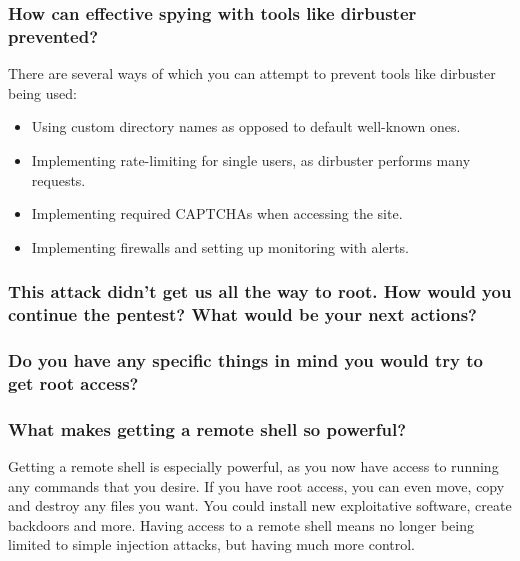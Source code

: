 \subsubsection{How can effective spying with tools like dirbuster prevented?}
There are several ways of which you can attempt to prevent tools like dirbuster being used:

\begin{itemize}
  \item Using custom directory names as opposed to default well-known ones.
  \item Implementing rate-limiting for single users, as dirbuster performs many requests.
  \item Implementing required CAPTCHAs when accessing the site.
  \item Implementing firewalls and setting up monitoring with alerts.
\end{itemize}

\subsubsection{This attack didn't get us all the way to root. How would you continue the pentest? What would be your next actions?}


\subsubsection{Do you have any specific things in mind you would try to get root access?}


\subsubsection{What makes getting a remote shell so powerful?}
Getting a remote shell is especially powerful, as you now have access to running any commands that you desire. If you have root access, you can even move, copy and destroy any files you want. You could install new exploitative software, create backdoors and more. Having access to a remote shell means no longer being limited to simple injection attacks, but having much more control.